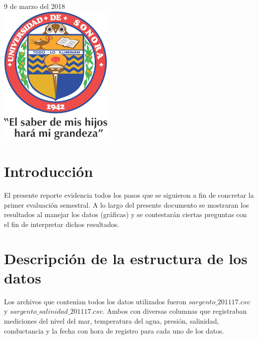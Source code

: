 \begin{titlepage}

{\large 9 de marzo del 2018}\\[1cm] %


\includegraphics[width=5.5cm]{Logo.jpg}\\[1cm] %
 

\vfill %

\end{titlepage}

\section{Introducción}
El presente reporte evidencia todos los pasos que se siguieron a fin de concretar la primer evaluación semestral. A lo largo del presente documento se mostraran los resultados al manejar los datos (gráficas) y se contestarán ciertas preguntas con el fin de interpretar dichos resultados.

\section{Descripción de la estructura de los datos}
Los archivos que contenían todos los datos utilizados fueron $sargento\_201117.csv$ y $sargento\_salinidad\_201117.csv$. Ambos con diversas columnas que registraban mediciones del nivel del mar, temperatura del agua, presión, salinidad, conductancia y la fecha con hora de registro para cada uno de los datos.


